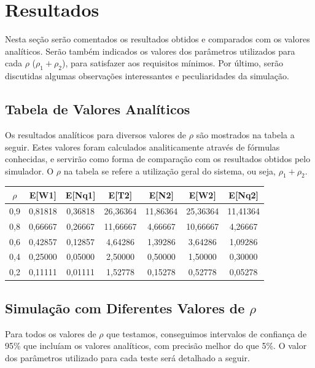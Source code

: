 \documentclass[a4paper,12pt]{report}
\begin{document}
\chapter{Resultados}

Nesta seção serão comentados os resultados obtidos e comparados com os valores analíticos. Serão também indicados os valores dos parâmetros utilizados para cada $\rho$ ($\rho_1 + \rho_2$), para satisfazer aos requisitos mínimos. Por último, serão discutidas algumas observações interessantes e peculiaridades da simulação.

\section{Tabela de Valores Analíticos}

Os resultados analíticos para diversos valores de $\rho$ são mostrados na tabela a seguir. Estes valores foram calculados analiticamente através de fórmulas conhecidas, e servirão como forma de comparação com os resultados obtidos pelo simulador. O $\rho$ na tabela se refere a utilização geral do sistema, ou seja, $\rho_1 + \rho_2$.

\begin{center}
\begin{tabular}{ c c c c c c c }
    \hline
	\textbf{$\rho$} & \textbf{E[W1]} & \textbf{E[Nq1]} & \textbf{E[T2]} & \textbf{E[N2]} & \textbf{E[W2]} & \textbf{E[Nq2]} \\
	\hline
	0,9 & 0,81818 & 0,36818 & 26,36364 & 11,86364 & 25,36364 & 11,41364 \\
	0,8 & 0,66667 & 0,26667 & 11,66667 & 4,66667 & 10,66667 & 4,26667 \\
	0,6 & 0,42857 & 0,12857 & 4,64286 & 1,39286 & 3,64286 & 1,09286 \\
	0,4 & 0,25000 & 0,05000 & 2,50000 & 0,50000 & 1,50000 & 0,30000 \\
	0,2 & 0,11111 & 0,01111 & 1,52778 & 0,15278 & 0,52778 & 0,05278 \\
	\hline
\end{tabular}
\end{center}

\section{Simulação com Diferentes Valores de $\rho$}

Para todos os valores de $\rho$ que testamos, conseguimos intervalos de confiança de 95\% que incluíam os valores analíticos, com precisão melhor do que 5\%. O valor dos parâmetros utilizado para cada teste será detalhado a seguir.
\end{document}
